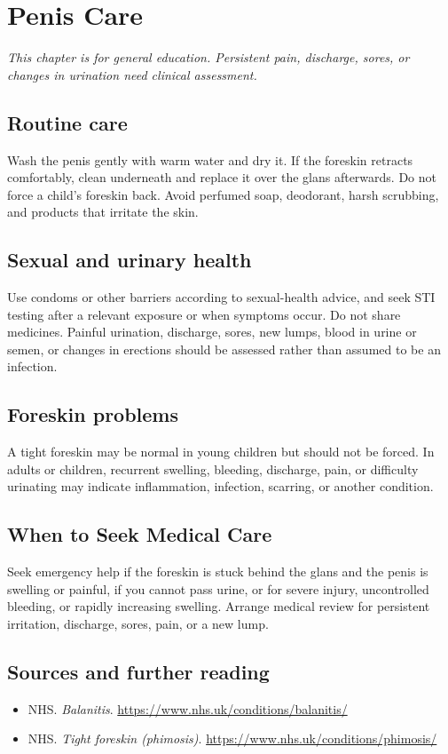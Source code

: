 \chapter{Penis Care}

\medskip
\noindent\textit{This chapter is for general education. Persistent pain, discharge, sores, or changes in urination need clinical assessment.}

\section*{Routine care}
Wash the penis gently with warm water and dry it. If the foreskin retracts comfortably, clean underneath and replace it over the glans afterwards. Do not force a child’s foreskin back. Avoid perfumed soap, deodorant, harsh scrubbing, and products that irritate the skin.

\section*{Sexual and urinary health}
Use condoms or other barriers according to sexual-health advice, and seek STI testing after a relevant exposure or when symptoms occur. Do not share medicines. Painful urination, discharge, sores, new lumps, blood in urine or semen, or changes in erections should be assessed rather than assumed to be an infection.

\section*{Foreskin problems}
A tight foreskin may be normal in young children but should not be forced. In adults or children, recurrent swelling, bleeding, discharge, pain, or difficulty urinating may indicate inflammation, infection, scarring, or another condition.

\section*{When to Seek Medical Care}
Seek emergency help if the foreskin is stuck behind the glans and the penis is swelling or painful, if you cannot pass urine, or for severe injury, uncontrolled bleeding, or rapidly increasing swelling. Arrange medical review for persistent irritation, discharge, sores, pain, or a new lump.

\section*{Sources and further reading}
\begin{itemize}
\item NHS. \textit{Balanitis}. \url{https://www.nhs.uk/conditions/balanitis/}
\item NHS. \textit{Tight foreskin (phimosis)}. \url{https://www.nhs.uk/conditions/phimosis/}
\end{itemize}
